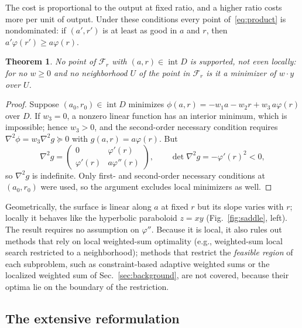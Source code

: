 \documentclass[journal]{IEEEtran}
\newtheorem{theorem}{Theorem}
\theoremstyle{remark}
\begin{document}
The cost is proportional to the output at fixed ratio, and a higher ratio costs more per unit of
output. Under these conditions every point of~\eqref{eq:product} is nondominated: if $(a',r')$ is at
least as good in $a$ and $r$, then $a'\varphi(r') \ge a\varphi(r)$.

\begin{theorem}
\label{thm:saddle}
No point of $\mathcal{F}_r$ with $(a,r) \in \operatorname{int} D$ is supported, not even locally: for
no $w \ge 0$ and no neighborhood $U$ of the point in $\mathcal{F}_r$ is it a minimizer of $w\cdot y$
over $U$.
\end{theorem}

\begin{proof}
Suppose $(a_0,r_0) \in \operatorname{int} D$ minimizes
$\phi(a,r) = -w_1a - w_2r + w_3\,a\varphi(r)$ over $D$. If $w_3 = 0$, a nonzero linear function has an
interior minimum, which is impossible; hence $w_3 > 0$, and the second-order necessary condition
requires $\nabla^2\phi = w_3\nabla^2 g \succeq 0$ with $g(a,r) = a\varphi(r)$. But
\begin{equation}
\nabla^2 g = \begin{pmatrix} 0 & \varphi'(r)\\ \varphi'(r) & a\varphi''(r)\end{pmatrix},
\qquad \det\nabla^2 g = -\varphi'(r)^2 < 0,
\end{equation}
so $\nabla^2 g$ is indefinite. Only first- and second-order necessary conditions at $(a_0,r_0)$ were
used, so the argument excludes local minimizers as well.
\end{proof}

Geometrically, the surface is linear along $a$ at fixed $r$ but its slope varies with $r$; locally it
behaves like the hyperbolic paraboloid $z = xy$ (Fig.~\ref{fig:saddle}, left). The result requires no
assumption on $\varphi''$. Because it is local, it also rules out methods that rely on local
weighted-sum optimality (e.g., weighted-sum local search restricted to a neighborhood); methods that
restrict the \emph{feasible region} of each subproblem, such as constraint-based adaptive weighted sums
or the localized weighted sum of Sec.~\ref{sec:background}, are not covered, because their optima lie on
the boundary of the restriction.

\subsection{The extensive reformulation}
\end{document}
